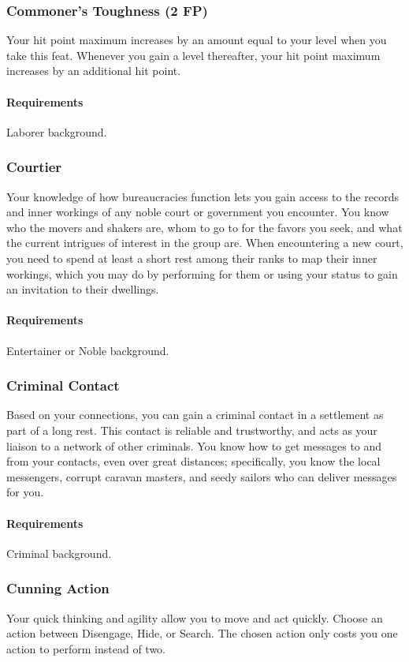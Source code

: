 \subsubsection{Commoner's Toughness (2 FP)} \label{feat::commonerstoughness}
    Your hit point maximum increases by an amount equal to your level when you take this feat.
    Whenever you gain a level thereafter, your hit point maximum increases by an additional hit point.
    \paragraph{Requirements} Laborer background.
\subsubsection{Courtier} \label{feat::courtier}
    Your knowledge of how bureaucracies function lets you gain access to the records and inner workings of any noble court or government you encounter.
    You know who the movers and shakers are, whom to go to for the favors you seek, and what the current intrigues of interest in the group are.
    When encountering a new court, you need to spend at least a short rest among their ranks to map their inner workings, which you may do by performing for them or using your status to gain an invitation to their dwellings.
    \paragraph{Requirements} Entertainer or Noble background.
\subsubsection{Criminal Contact} \label{feat::criminalcontact}
    Based on your connections, you can gain a criminal contact in a settlement as part of a long rest.
    This contact is reliable and trustworthy, and acts as your liaison to a network of other criminals.
    You know how to get messages to and from your contacts, even over great distances; specifically, you know the local messengers, corrupt caravan masters, and seedy sailors who can deliver messages for you.
    \paragraph{Requirements} Criminal background.
\subsubsection{Cunning Action} \label{feat::cunningaction}
    Your quick thinking and agility allow you to move and act quickly.
    Choose an action between Disengage, Hide, or Search.
    The chosen action only costs you one action to perform instead of two.

